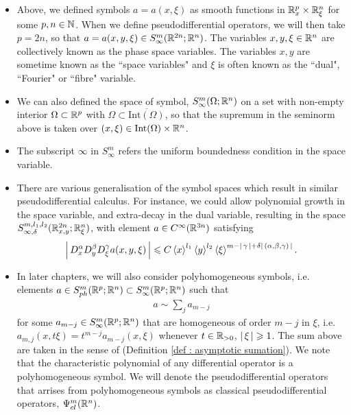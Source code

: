 \documentclass[12pt]{article}
\begin{document}
\begin{rem} \hfill 
    \begin{itemize}
        \item Above, we defined symbols $a = a(x, \xi)$ as smooth functions in $\R^p_x \times \R^n_\xi$ for some $p, n \in \N$. When we define pseudodifferential operators, we will then take $p = 2n$, so that $a = a(x, y, \xi) \in S^{m}_\infty(\R^{2n}; \R^n)$. The variables $x, y, \xi \in \R^n$  are collectively known as the phase space variables. The variables $x, y$ are sometime known as the ``space variables" and $\xi$ is often known as the ``dual", ``Fourier" or ``fibre" variable.
        
        \item  We can also defined the space of symbol, $S^m_\infty(\Omega; \R^n)$ on a set with non-empty interior $\Omega \subset \R^p$ with $\Omega \subset \overline{\mathrm{Int}(\Omega)}$, so that the supremum in the seminorm above is taken over $(x, \xi) \in \mathrm{Int}(\Omega) \times \R^n$. 
        
        \item The subscript $\infty$ in $S^m_\infty$ refers the uniform boundedness condition in the space variable.
        
        \item There are various generalisation of the symbol spaces which result in similar pseudodifferential calculus. For instance, we could allow polynomial growth in the space variable, and extra-decay in the dual variable, resulting in the space $S^{m, l_1, l_2}_{\infty, \delta}(\R^{2n}_{x, y}; \R^n_{\xi})$, with element $a \in C^\infty(\R^{3n})$ satisfying
        \begin{align*}
        \abs{D^\alpha_xD^\beta_y D^\gamma_\xi a(x, y, \xi)} \leq C \sym[x]^{l_1} \sym[y]^{l_2} \sym[\xi]^{m - \abs{\gamma} + \delta \abs{(\alpha, \beta, \gamma)}}. 
        \end{align*}
        
        \item In later chapters, we will also consider polyhomogeneous symbols, i.e. elements $a \in S^{m}_{ph}(\R^{p}; \R^n) \subset S^{m}_\infty(\R^{p}; \R^n)$ such that
        \begin{align*}
        a \sim \sum_{j} a_{m - j}
        \end{align*} 
        for some $a_{m -j} \in S^{m}_\infty(\R^{p}; \R^n)$ that are homogeneous of order $m - j$  in $\xi$, i.e. $a_{m, j}(x, t \xi) = t^{m - j}a_{m - j}(x, \xi)$ whenever $t \in \R_{> 0}$, $\abs{\xi} \geq 1$. The sum above are taken in the sense of (Definition \ref{def : asymptotic sumation}). We note that the characteristic polynomial of any differential operator is a polyhomogeneous symbol. We will denote the pseudodifferential operators that arrises from polyhomogeneous symbols as classical pseudodifferential operators, $\Psi^{m}_{cl}(\R^n)$. 
        
    \end{itemize}
\end{rem}
\end{document}
